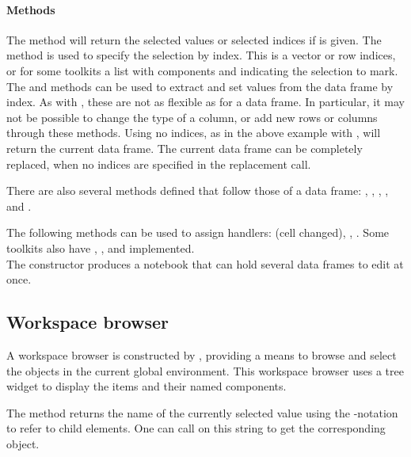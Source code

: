 \paragraph{Methods} The  method will return the
selected values or selected indices if  is given. The
 method is used to specify the selection by
index. This is a vector or row indices, or for some toolkits a list
with components  and  indicating the
selection to mark.  The \method{[}{gdf} and \method{[\ASSIGN}{gdf}
methods can be used to extract and set values from the data frame by
index. As with , these are not as flexible as for a data
frame. In particular, it may not be possible to change the type of a
column, or add new rows or columns through these methods. Using no
indices, as in the above example with , will return the
current data frame. The current data frame can be completely replaced,
when no indices are specified in the replacement call.

There are also several methods defined that follow those of a data
frame: , ,
, , and
.

The following methods can be used to assign handlers:
 (cell changed),
,
. Some toolkits also have
,
, and
 implemented.
\\


The  constructor produces a notebook that can
hold several data frames to edit at once.





\subsection{Workspace browser}
\label{sec:gWidgets-workspace-browser}

A workspace browser is constructed by , providing a
means to browse and select the objects in the current global
environment. This workspace browser uses a tree widget to display the
items and their named components.

The  method returns the name of the currently selected value
using the \code{\$}-notation to refer to child elements.  One can call
 on this string to get the corresponding \R\/ object.

